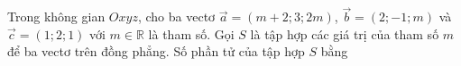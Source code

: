 \begin{ex}
Trong không gian $Oxyz$, cho ba vectơ $\vec a=(m+2;3;2m)$, $\vec b=(2;-1;m)$ và $\vec c=(1;2;1)$ với $m\in\mathbb R$ là tham số. Gọi $S$ là tập hợp các giá trị của tham số $m$ để ba vectơ trên đồng phẳng. Số phần tử của tập hợp $S$ bằng
\end{ex}
